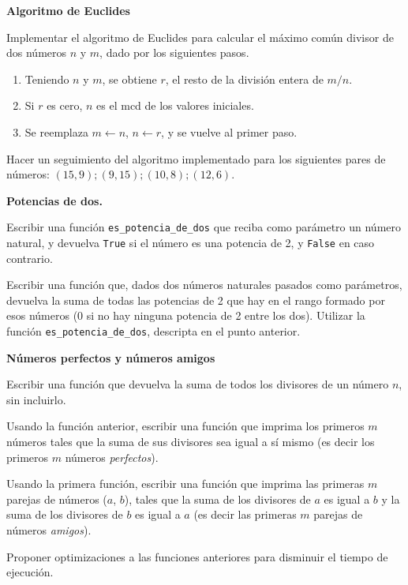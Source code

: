 \begin{ejercicio}
{\bf Algoritmo de Euclides}
\begin{partes}
    \item Implementar el algoritmo de Euclides para calcular el máximo
común divisor de dos números $n$ y $m$, dado por los siguientes pasos.
    \begin{enumerate}
        \item Teniendo $n$ y $m$, se obtiene $r$, el resto de la
división entera de $m/n$.
        \item Si $r$ es cero, $n$ es el mcd de los valores iniciales.
        \item Se reemplaza $m \leftarrow n$, $n \leftarrow r$, y se vuelve al
primer paso.
    \end{enumerate}
    \item Hacer un seguimiento del algoritmo implementado para los siguientes
pares de números: $(15,9); (9,15); (10,8); (12,6)$.
\end{partes}
\end{ejercicio}

\begin{ejercicio}
{\bf Potencias de dos.}
\begin{partes}
    \item Escribir una función \verb!es_potencia_de_dos! que reciba como parámetro
un número natural, y devuelva \verb!True! si el número es una potencia de 2,
y \verb!False! en caso contrario.
    \item Escribir una función que, dados dos números naturales pasados como
parámetros, devuelva la suma de todas las potencias de 2 que hay en el
rango formado por esos números (0 si no hay ninguna potencia de 2 entre los
dos). Utilizar la función \verb!es_potencia_de_dos!, descripta en el
punto anterior.
\end{partes}
\end{ejercicio}


\begin{ejercicio}
{\bf Números perfectos y números amigos}
\begin{partes}
    \item Escribir una función que devuelva la suma de todos los divisores de
un número $n$, sin incluirlo.
    \item Usando la función anterior, escribir una función que imprima los
primeros $m$ números tales que la suma de sus divisores sea igual a sí
mismo (es decir los primeros $m$ números \emph{perfectos}).
    \item Usando la primera función, escribir una función que imprima las
primeras $m$ parejas de números ($a$, $b$), tales que la suma de los
divisores de $a$ es igual a $b$ y la suma de los divisores de $b$ es igual
a $a$ (es decir las primeras $m$ parejas de números \emph{amigos}).
    \item Proponer optimizaciones a las funciones anteriores para disminuir el
tiempo de ejecución.
\end{partes}
\end{ejercicio}

